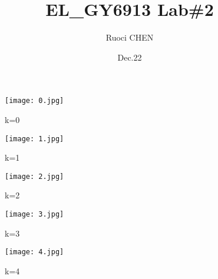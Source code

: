 \documentclass[twoside]{article}
\begin{document}
\title{EL\_GY6913 Lab\#2}
\author{Ruoci CHEN}
\date{Dec.22}
\newpage

\begin{CJK*}{GBK}{song}
\begin{figure}[htbp]
  \texttt{[image: 0.jpg]}
  \caption{k=0}
\end{figure}
\begin{figure}[htbp]
  \texttt{[image: 1.jpg]}
  \caption{k=1}
\end{figure}
\begin{figure}[htbp]
  \texttt{[image: 2.jpg]}
  \caption{k=2}
\end{figure}
\begin{figure}[htbp]
  \texttt{[image: 3.jpg]}
  \caption{k=3}
\end{figure}
\begin{figure}[htbp]
  \texttt{[image: 4.jpg]}
  \caption{k=4}
\end{figure}
\end{CJK*}
\end{document}
